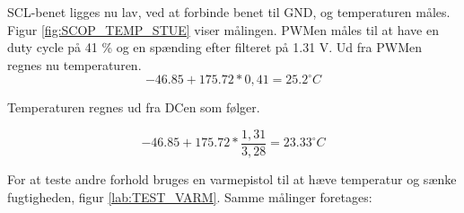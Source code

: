SCL-benet ligges nu lav, ved at forbinde benet til GND, og temperaturen måles. Figur \ref{fig:SCOP_TEMP_STUE} viser målingen. PWMen måles til at have en duty cycle på 41 \% og en spænding efter filteret på 1.31 V. 
Ud fra PWMen regnes nu temperaturen.
\begin{equation}
-46.85+175.72*0,41=25.2^{\circ}C
\end{equation}

Temperaturen regnes ud fra DCen som følger. 

\begin{equation}
-46.85+175.72*\frac{1,31}{3,28}=23.33^{\circ}C
\end{equation}


For at teste andre forhold bruges en varmepistol til at hæve temperatur og sænke fugtigheden, figur \ref{lab:TEST_VARM}. 
Samme målinger foretages:


